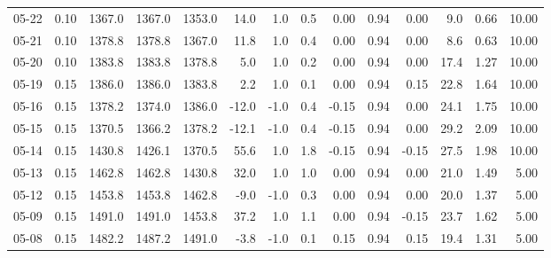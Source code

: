 \begin{threeparttable}
{\begin{tabular}{lrrrrrrrrrrrrr}
  05-22 &     0.10 & 1367.0 & 1367.0 & 1353.0 &       14.0 &                      1.0 &                 0.5 &       0.00 &      0.94 &           0.00 &              9.0 &            0.66 &                  10.00 \\
  05-21 &     0.10 & 1378.8 & 1378.8 & 1367.0 &       11.8 &                      1.0 &                 0.4 &       0.00 &      0.94 &           0.00 &              8.6 &            0.63 &                  10.00 \\
  05-20 &     0.10 & 1383.8 & 1383.8 & 1378.8 &        5.0 &                      1.0 &                 0.2 &       0.00 &      0.94 &           0.00 &             17.4 &            1.27 &                  10.00 \\
  05-19 &     0.15 & 1386.0 & 1386.0 & 1383.8 &        2.2 &                      1.0 &                 0.1 &       0.00 &      0.94 &           0.15 &             22.8 &            1.64 &                  10.00 \\
  05-16 &     0.15 & 1378.2 & 1374.0 & 1386.0 &      -12.0 &                     -1.0 &                 0.4 &      -0.15 &      0.94 &           0.00 &             24.1 &            1.75 &                  10.00 \\
  05-15 &     0.15 & 1370.5 & 1366.2 & 1378.2 &      -12.1 &                     -1.0 &                 0.4 &      -0.15 &      0.94 &           0.00 &             29.2 &            2.09 &                  10.00 \\
  05-14 &     0.15 & 1430.8 & 1426.1 & 1370.5 &       55.6 &                      1.0 &                 1.8 &      -0.15 &      0.94 &          -0.15 &             27.5 &            1.98 &                  10.00 \\
  05-13 &     0.15 & 1462.8 & 1462.8 & 1430.8 &       32.0 &                      1.0 &                 1.0 &       0.00 &      0.94 &           0.00 &             21.0 &            1.49 &                   5.00 \\
  05-12 &     0.15 & 1453.8 & 1453.8 & 1462.8 &       -9.0 &                     -1.0 &                 0.3 &       0.00 &      0.94 &           0.00 &             20.0 &            1.37 &                   5.00 \\
  05-09 &     0.15 & 1491.0 & 1491.0 & 1453.8 &       37.2 &                      1.0 &                 1.1 &       0.00 &      0.94 &          -0.15 &             23.7 &            1.62 &                   5.00 \\
  05-08 &     0.15 & 1482.2 & 1487.2 & 1491.0 &       -3.8 &                     -1.0 &                 0.1 &       0.15 &      0.94 &           0.15 &             19.4 &            1.31 &                   5.00 \\

\end{tabular}}
\end{threeparttable}
